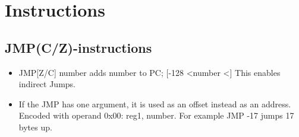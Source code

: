 \documentclass[a4paper, 12pt]{article}
\begin{document}
	\section{Instructions}
	\small\begin{center}	
		\subsection{JMP(C/Z)-instructions}
		\begin{itemize}
			\item JMP[Z/C] number adds number to PC; [-128 \textless \space number \textless {}]
				This enables indirect Jumps.			
			\item If the JMP has one argument, it is used as an offset instead as an address. Encoded with operand 0x00: reg1, number.\newline
				For example JMP -17 jumps 17 bytes up.
		\end{itemize}

\end{center}
\end{document}
